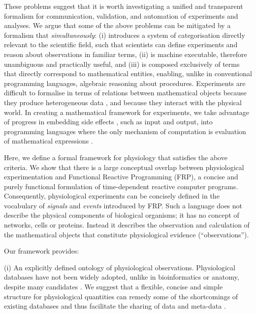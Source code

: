 These problems suggest that it is worth investigating a
unified and transparent formalism for communication, validation, and
automation of experiments and analyses. We argue that
some of the above problems can be mitigated by a formalism that
\emph{simultaneously}: (i) introduces a system of categorisation
directly relevant to the scientific field, such that scientists can
define experiments and reason about observations in familiar terms,
(ii) is machine executable, therefore unambiguous and practically
useful, and (iii) is composed exclusively of terms that directly
correspond to mathematical entities, enabling, unlike in conventional
programming languages, algebraic reasoning about procedures.
Experiments are difficult to formalise in terms of relations between
mathematical objects because they produce heterogeneous data
\cite{Tukey1962}, and because they interact with the physical
world. In creating a mathematical framework for experiments, we take
advantage of progress in embedding side effects \cite{PeytonJones2002,
  Roy2004, Wadler1995}, such as input and output, into programming
languages where the only mechanism of computation is evaluation of
mathematical expressions \cite{Church1941}.

Here, we define a formal framework for physiology
that satisfies the above criteria. We show that there
is a large conceptual overlap between physiological experimentation
and Functional Reactive Programming (FRP\cite{Elliott1997,
  Nilsson2002}), a concise and purely functional formulation of
time-dependent reactive computer programs. Consequently, physiological
experiments can be concisely defined in the vocabulary of
\emph{signals} and \emph{events} introduced by FRP. Such a language
does not describe the physical components of biological organisms; it
has no concept of networks, cells or proteins. Instead it describes
the observation and calculation of the mathematical objects that
constitute physiological evidence (``observations'').

Our framework provides:

(i) An explicitly defined ontology of physiological
observations. Physiological databases have not been widely
adopted\cite{Herz2008, Amari2002}, unlike in bioinformatics or
anatomy, despite many candidates \cite{Jessop2010, Teeters2008,
  Frishkoff2009, Katz2010}.  We suggest that a flexible, concise and
simple structure for physiological quantities can remedy some of the
shortcomings\cite{Gardner2005, Amari2002} of existing databases and
thus facilitate the sharing of data and meta-data \cite{Insel2003}.

